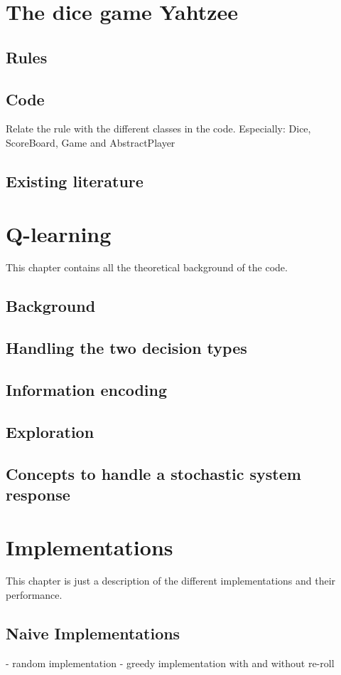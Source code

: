 \documentclass{article}
\begin{document}
\section{The dice game Yahtzee}
\subsection{Rules}
\subsection{Code}
Relate the rule with the different classes in the code.
Especially: Dice, ScoreBoard, Game and AbstractPlayer
\subsection{Existing literature}

\section{Q-learning}
This chapter contains all the theoretical background of the code.
\subsection{Background}
\subsection{Handling the two decision types}
\subsection{Information encoding}
\subsection{Exploration}
\subsection{Concepts to handle a stochastic system response}

\section{Implementations}
This chapter is just a description of the different implementations and their performance.
\subsection{Naive Implementations}
- random implementation
- greedy implementation with and without re-roll
\end{document}
